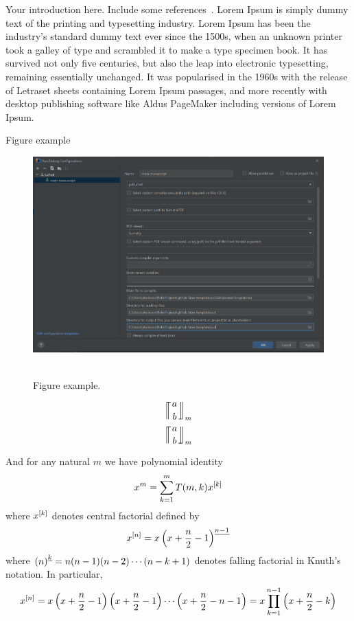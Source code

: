 Your introduction here.
Include some references~\cite{bayour2017truly,benkhettou2016conformable,caputo2009time,martins2009calculus,
    GithubSource_2022, Sloane_theencyclopedia}.
Lorem Ipsum is simply dummy text of the printing and typesetting industry.
Lorem Ipsum has been the industry's standard dummy text ever since the 1500s, when an unknown printer took a galley
of type and scrambled it to make a type specimen book.
It has survived not only five centuries, but also the leap into electronic typesetting, remaining essentially unchanged.
It was popularised in the 1960s with the release of Letraset sheets containing Lorem Ipsum passages, and more
recently with desktop publishing software like Aldus PageMaker including versions of Lorem Ipsum.

Figure example
\begin{figure}[H]
    \centering
    \includegraphics[width=1\textwidth]{../img/latex_configuration}
    ~\caption{Figure example.}\label{fig:figure}
\end{figure}

\begin{equation*}
     \llceil \nobarfrac{a}{b} \rrfloor_{m}
\end{equation*}
\begin{equation*}
    \llceilCoefficient{a}{b}{m}
\end{equation*}

And for any natural $m$ we have polynomial identity
\begin{equation}
    x^m = \sum_{k=1}^{m} T(m, k) x^{[k]}
    \label{eq:knuth-power-identity}
\end{equation}
where $x^{[k]}$ denotes central factorial defined by
\begin{equation*}
    x^{[n]} = x \left(x+\frac{n}{2}-1 \right)^{\underline{n-1}}
\end{equation*}
where $\left(n \right)^{\underline{k}} = n (n-1) (n-2) \cdots (n-k+1)$ denotes falling factorial in Knuth's notation.
In particular,
\begin{equation*}
    x^{[n]}
    = x \left( x+\frac{n}{2}-1 \right) \left( x+\frac{n}{2}-1 \right) \cdots \left (x+\frac{n}{2}-n-1 \right)
    = x \prod_{k=1}^{n-1} \left( x+\frac{n}{2}-k \right)
\end{equation*}
